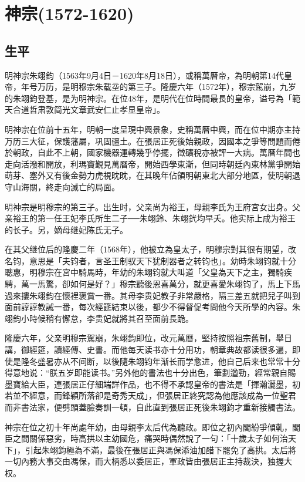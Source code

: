 
\section{神宗\tiny(1572-1620)}

\subsection{生平}

明神宗朱翊鈞（1563年9月4日－1620年8月18日），或稱萬曆帝，為明朝第14代皇帝，年号万历，是明穆宗朱载坖的第三子。隆慶六年（1572年），穆宗駕崩，九岁的朱翊鈞登基，是为明神宗。在位48年，是明代在位時間最長的皇帝，谥号為「範天合道哲肃敦简光文章武安仁止孝显皇帝」。

明神宗在位前十五年，明朝一度呈現中興景象，史稱萬曆中興，而在位中期亦主持万历三大征，保護藩屬，巩固疆土。在張居正死後始親政，因國本之爭等問題而倦於朝政，自此不上朝，國家機器運轉幾乎停擺，徵礦稅亦被評一大病。萬曆年間也走向活潑和開放，利瑪竇覲見萬曆帝，開始西學東漸，但同時朝廷內東林黨爭開始萌芽、塞外又有後金勢力虎視眈眈，在其晚年佔領明朝東北大部分地區，使明朝退守山海關，終走向滅亡的局面。

明神宗是明穆宗的第三子。出生时，父亲尚为裕王，母親李氏为王府宮女出身。父亲裕王的第一任王妃李氏所生二子──朱翊鈴、朱翊釴均早夭。他实际上成为裕王的长子。另，嫡母继妃陈氏无子。

在其父继位后的隆慶二年（1568年），他被立為皇太子，明穆宗對其很有期望，改名钧，意思是「夫钧者，言圣王制驭天下犹制器者之转钧也」。幼時朱翊钧就十分聰惠，明穆宗在宮中騎馬時，年幼的朱翊钧就大叫道「父皇為天下之主，獨騎疾騁，萬一馬驚，卻如何是好？」穆宗聽後恩喜萬分，就更喜愛朱翊钧了，馬上下馬過來摟朱翊鈞在懷裡褒賞一番。其母李贵妃教子非常嚴格，隔三差五就把兒子叫到面前諄諄教誡一番，每次經筵結束以後，都少不得督促考問他今天所學的內容。朱翊鈞小時候稍有懈怠，李贵妃就將其召至面前長跪。

隆慶六年，父亲明穆宗駕崩，朱翊鈞即位，改元萬曆，堅持按照祖宗舊制，舉日講，御經筵，讀經傳、史書。而他每天读书亦十分用功，朝章典故都读很多遍，即使是隆冬盛暑亦从不间断，以後隨朱翊钧年渐长而学愈进，他自己后来也常常十分得意地说：“朕五岁即能读书。”另外他的書法也十分出色，筆劃遒勁，經常親自賜墨寶給大臣，連張居正仔細端詳作品，也不得不承認皇帝的書法是「揮瀚灑墨，初若並不經意，而鋒穎所落卻是奇秀天成」，但張居正終究認為他應該成為一位聖君而非書法家，便劈頭蓋臉奏訓一頓，自此直到張居正死後朱翊鈞才重新接觸書法。

神宗在位之初十年尚處年幼，由母親李太后代為聽政。即位之初內閣紛爭傾軋，閣臣之間關係惡劣，時高拱以主幼國危，痛哭時偶然說了一句：「十歲太子如何治天下」，引起朱翊鈞極為不滿，最後在張居正與馮保添油加醋下罷免了高拱。太后將一切內務大事交由馮保，而大柄悉以委居正，軍政皆由張居正主持裁決，独握大权。

